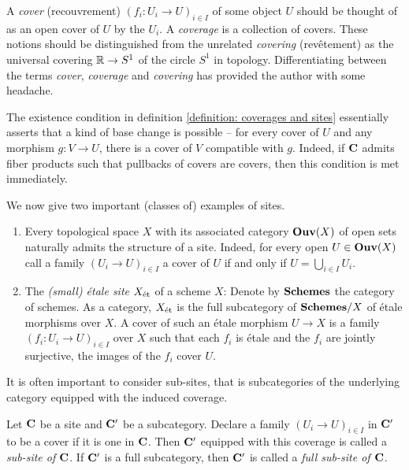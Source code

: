\begin{remark}[Terminology]
	A \emph{cover} (recouvrement) $(f_i\colon U_i \to U)_{i\in I}$ of some object $U$ should be thought of as an open cover of $U$ by the $U_i$. A \emph{coverage} is a collection of covers. These notions should be distinguished from the unrelated \emph{covering} (revêtement) as \eg the universal covering $\R \to S^1$ of the circle $S^1$ in topology. Differentiating between the terms \emph{cover}, \emph{coverage} and \emph{covering} has provided the author with some headache.
\end{remark}

\begin{remark}
	The existence condition in definition \ref{definition: coverages and sites} essentially asserts that a kind of base change is possible -- for every cover of $U$ and any morphism $g\colon V\to U$, there is a cover of $V$ compatible with $g$. Indeed, if $\site C$ admits fiber products such that pullbacks of covers are covers, then this condition is met immediately.
\end{remark}

\begin{example}
	We now give two important (classes of) examples of sites.
	\begin{enumerate}
		\item
		Every topological space $X$ with its associated category $\open X$ of open sets naturally admits the structure of a site. Indeed, for every open $U \in \open X$ call a family $(U_i \to U)_{i \in I}$ a cover of $U$ if and only if $U = \bigcup_{i \in I} U_i$. 
		
		\item	
		The \emph{(small) étale site} $\etalesite X$ of a scheme $X$: Denote by $\Schemes$ the category of schemes. As a category, $\etalesite X$ is the full subcategory of $\Overcategory \Schemes X$ of étale morphisms over $X$. A cover of such an étale morphism $U\to X$ is a family $(f_i \colon U_i \to U)_{i\in I}$ over $X$ such that each $f_i$ is étale and the $f_i$ are jointly surjective, \ie the images of the $f_i$ cover $U$.
	\end{enumerate}
\end{example}

It is often important to consider sub-sites, that is subcategories of the underlying category equipped with the induced coverage.
\begin{definition}
	Let $\site C$ be a site and $\site C'$ be a subcategory. Declare a family $(U_i\to U)_{i\in I}$ in $\site C'$ to be a cover if it is one in $\site C$. Then $\site C'$ equipped with this coverage is called a \emph{sub-site of $\site C$}. If $\site{C'}$ is a full subcategory, then $\site{C}'$ is called a \emph{full sub-site of $\site{C}$}.
\end{definition}

